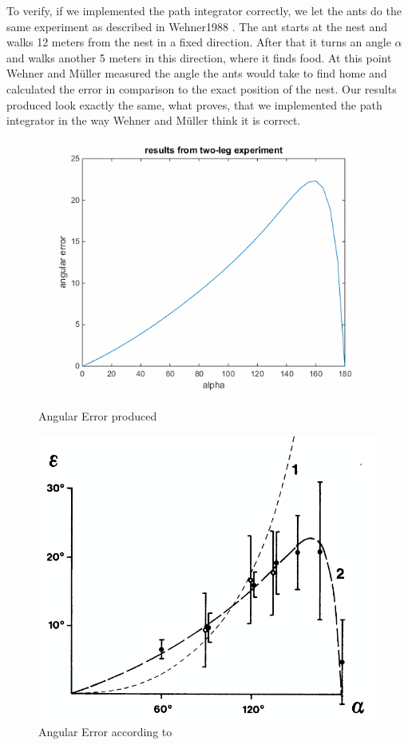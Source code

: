 \documentclass[11pt]{article}
\begin{document}
To verify, if we implemented the path integrator correctly, we let the ants do the same experiment as described in Wehner1988 \cite{Wehner1988}.
The ant starts at the nest and walks 12 meters from the nest in a fixed direction. After that it turns an angle $\alpha$ and walks another 5 meters in this direction, where it finds food. At this point Wehner and Müller measured the angle the ants would take to find home and calculated the error in comparison to the exact position of the nest.
Our results produced look exactly the same, what proves, that we implemented the path integrator in the way Wehner and Müller think it is correct.\\


\begin{figure}[h!]%
\begin{minipage}[t]{7.9 cm}
\centering
\includegraphics[scale=0.4]{./Pics/angularError.png} 
\caption{Angular Error produced \label{fig:AngErrorProd} }
\end{minipage}
%
\begin{minipage}[t]{7.9 cm}
\centering
\includegraphics[scale=0.3]{./Pics/angularErrorOfWehner.png} 
\caption{Angular Error according to \cite{Wehner1988} \label{fig:AngErrorWehner} }
\end{minipage}
\end{figure}
\end{document}
